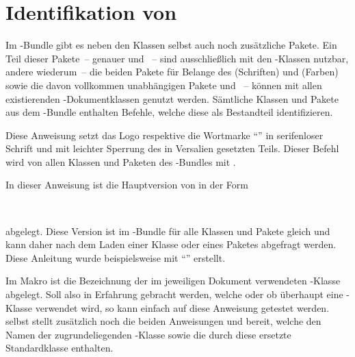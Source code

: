 \chapter{Identifikation von \TUDScript}
Im \TUDScript-Bundle gibt es neben den Klassen selbst auch noch zusätzliche 
Pakete. Ein Teil dieser Pakete~-- genauer  und 
~-- sind ausschließlich mit den \TUDScript-Klassen nutzbar, 
andere wiederum~-- die beiden Pakete für Belange des \CDs {} 
(Schriften) und  (Farben) sowie die davon vollkommen 
unabhängigen Pakete  und ~-- können mit 
allen existierenden -Dokumentklassen genutzt werden. Sämtliche 
Klassen und Pakete aus dem \TUDScript-Bundle enthalten Befehle, welche diese 
als Bestandteil identifizieren.

\begin{Declaration}[v2.04]{}
\printdeclarationlist%
%
Diese Anweisung setzt das Logo respektive die Wortmarke \enquote{\TUDScript{}} 
in serifenloser Schrift und mit leichter Sperrung des in Versalien gesetzten 
Teils. Dieser Befehl wird von allen Klassen und Paketen des \TUDScript-Bundles 
mit .
\end{Declaration}

\begin{Declaration}[v2.04]{}
\printdeclarationlist%
%
In dieser Anweisung ist die Hauptversion von \TUDScript in der Form
\begin{quoting}
~~
\end{quoting}
abgelegt. Diese Version ist im \TUDScript-Bundle für alle Klassen und Pakete 
gleich und kann daher nach dem Laden einer Klasse oder eines Paketes abgefragt 
werden. Diese Anleitung wurde beispielsweise mit \enquote{\TUDVersion{}} 
erstellt.
\end{Declaration}

\begin{Declaration}[v2.04]{}
\printdeclarationlist%
%
Im Makro  ist die Bezeichnung der im jeweiligen Dokument 
verwendeten \TUDScript-Klasse abgelegt. Soll also in Erfahrung gebracht werden, 
welche oder ob überhaupt eine \TUDScript-Klasse verwendet wird, so kann einfach 
auf diese Anweisung getestet werden. \KOMAScript{} selbst stellt zusätzlich 
noch die beiden Anweisungen  und  
bereit, welche den Namen der zugrundeliegenden \KOMAScript-Klasse sowie die 
durch diese ersetzte Standardklasse enthalten.
\end{Declaration}
